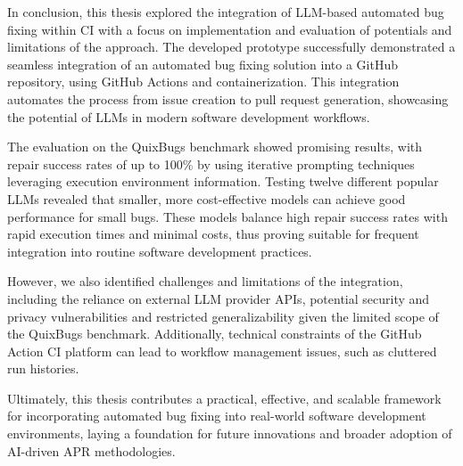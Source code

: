 In conclusion, this thesis explored the integration of LLM-based automated bug fixing within \acf{CI} with a focus on implementation and evaluation of potentials and limitations of the approach. The developed prototype successfully demonstrated a seamless integration of an automated bug fixing solution into a GitHub repository, using GitHub Actions and containerization. This integration automates the process from issue creation to pull request generation, showcasing the potential of LLMs in modern software development workflows.

The evaluation on the QuixBugs benchmark showed promising results, with repair success rates of up to 100\% by using iterative prompting techniques leveraging execution environment information. Testing twelve different popular \acp{LLM} revealed that smaller, more cost-effective models can achieve good performance for small bugs. These models balance high repair success rates with rapid execution times and minimal costs, thus proving suitable for frequent integration into routine software development practices.

However, we also identified challenges and limitations of the integration, including the reliance on external LLM provider \acp{API}, potential security and privacy vulnerabilities and restricted generalizability given the limited scope of the QuixBugs benchmark. Additionally, technical constraints of the GitHub Action CI platform can lead to workflow management issues, such as cluttered run histories.

Ultimately, this thesis contributes a practical, effective, and scalable framework for incorporating automated bug fixing into real-world software development environments, laying a foundation for future innovations and broader adoption of AI-driven \ac{APR} methodologies.